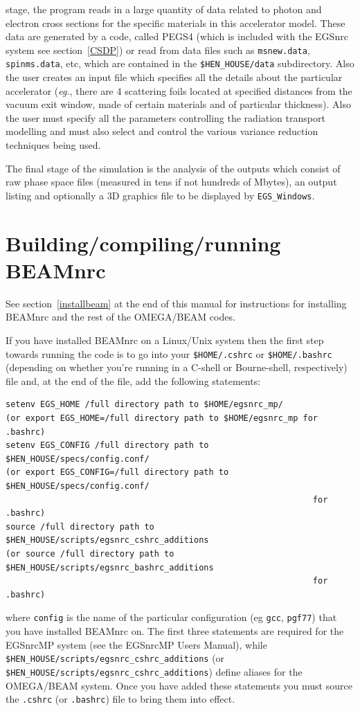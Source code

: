 \documentclass[12pt,twoside]{article}
\newcommand{\eg}{{\em eg.}}
\begin{document}
stage, the program reads in a large quantity of data related to photon
and electron cross sections for the specific materials in this
accelerator model. These data are generated by a code,
called PEGS4 (which is included with the EGSnrc system
see section~\ref{CSDP}) or read from data files such as
{\tt msnew.data}, {\tt spinms.data}, etc,  which are contained in the
{\tt \$HEN\_HOUSE/data} subdirectory. Also the user creates an input file
which specifies
all the details about the particular accelerator (\eg, there are 4 scattering
foils located at specified distances from the vacuum exit window,
made of certain materials and of particular thickness).  Also the user
must specify all the parameters controlling the radiation transport
modelling and must also select and control the various variance
reduction techniques being used.

The final stage of the simulation is the analysis of the outputs which
consist of raw phase space files (measured in tens if not hundreds of
Mbytes), an output listing and optionally a 3D graphics file to be displayed
by {\tt EGS\_Windows}\cite{TR99a}.

\section{Building/compiling/running BEAMnrc}

See section~\ref{installbeam} at the end of this manual for
instructions for installing BEAMnrc and the rest of
the OMEGA/BEAM codes.

If you have installed BEAMnrc on a Linux/Unix system then the first
step towards running the code is to go into your {\tt \$HOME/.cshrc}
or {\tt \$HOME/.bashrc} (depending on whether you're running in a C-shell
or Bourne-shell, respectively) file and, at the end of the file, add the
following statements:
\begin{verbatim}
setenv EGS_HOME /full directory path to $HOME/egsnrc_mp/
(or export EGS_HOME=/full directory path to $HOME/egsnrc_mp for .bashrc)
setenv EGS_CONFIG /full directory path to $HEN_HOUSE/specs/config.conf/
(or export EGS_CONFIG=/full directory path to $HEN_HOUSE/specs/config.conf/
                                                              for .bashrc)
source /full directory path to $HEN_HOUSE/scripts/egsnrc_cshrc_additions
(or source /full directory path to $HEN_HOUSE/scripts/egsnrc_bashrc_additions
                                                              for .bashrc)
\end{verbatim}
where {\tt config} is the name of the particular configuration
(eg {\tt gcc}, {\tt pgf77}) that you have installed BEAMnrc on.  The
first three statements are required for the
EGSnrcMP system (see the EGSnrcMP Users Manual\cite{Ka03}), while
{\tt \$HEN\_HOUSE/scripts/egsnrc\_cshrc\_additions}
(or {\tt \$HEN\_HOUSE/scripts/egsnrc\_cshrc\_additions}) define aliases
for the OMEGA/BEAM system.  Once you have added these statements you
must source the {\tt .cshrc}
(or {\tt .bashrc}) file to bring them into effect.
\end{document}
